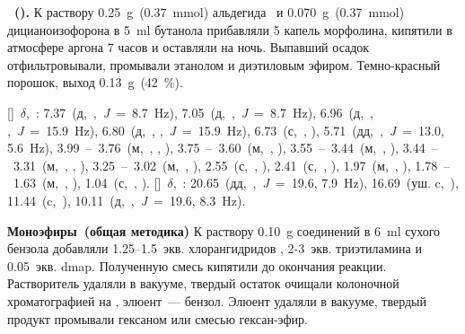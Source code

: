 \textbf{~().} К раствору \SI{0.25}{\gram}~(\SI{0.37}{\mmol}) альдегида~\textbf{} и \SI{0.070}{\gram}~(\SI{0.37}{\mmol}) дицианоизофорона в \SI{5}{\milli\litre} бутанола прибавляли 5 капель морфолина, кипятили в атмосфере аргона 7 часов и оставляли на ночь. Выпавший осадок отфильтровывали, промывали этанолом и диэтиловым эфиром. Темно-красный порошок, выход \SI{0.13}{\gram}~(\SI{42}{\percent}).
\begin{experimental}
    []~$\delta$,~\si{\ppm}: 7.37~(д,~,~\textit{J}~=~8.7~\si{\hertz}), 7.05~(д,~,~\textit{J}~=~8.7~\si{\hertz}), 6.96~(д,~, ,~\textit{J}~=~15.9~\si{\hertz}), 6.80~(д,~, ,~\textit{J}~=~15.9~\si{\hertz}), 6.73~(с,~, ), 5.71~(дд,~,~\textit{J}~=~13.0, 5.6~\si{\hertz}), 3.99~--~3.76~(м,~, , ), 3.75~--~3.60~(м,~, ), 3.55~--~3.44~(м,~, ), 3.44~--~3.31~(м,~, , ), 3.25~--~3.02~(м,~, ), 2.55~(с,~, ), 2.41~(с,~, ), 1.97~(м,~, ), 1.78~--~1.63~(м,~, ), 1.04~(с,~, ).
    []~$\delta$,~\si{\ppm}: 20.65~(дд,~,~\textit{J}~=~19.6, 7.9~\si{\hertz}), 16.69~(уш. c,~), 11.44~(c,~), 10.11~(д,~,~\textit{J}~=~19.6, 8.3~\si{\hertz}).
\end{experimental}

\textbf{Моноэфиры~(общая методика)}
К раствору \SI{0.10}{\gram} соединений  в \SI{6}{\milli\litre} сухого бензола добавляли 1.25--1.5~экв. хлорангидридов , 2-3~экв. триэтиламина и 0.05~экв. \ac{dmap}.
Полученную смесь кипятили до окончания реакции.
Растворитель удаляли в вакууме, твердый остаток очищали колоночной хроматографией на , элюент~--- бензол.
Элюент удаляли в вакууме, твердый продукт промывали гексаном или смесью гексан-эфир.

